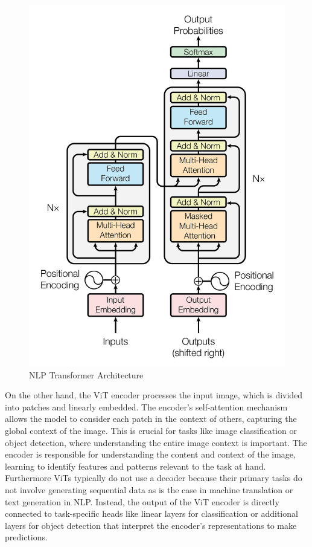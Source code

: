 \begin{figure}[h!]
    \centering
    \includegraphics[scale=0.2]{Figures/transformer_basis.jpg}
    \caption{NLP Transformer Architecture}
    \label{fig:tr-base}
\end{figure}

\newpage
On the other hand, the ViT encoder processes the input image, which is divided into patches and linearly embedded. The encoder's self-attention mechanism 
allows the model to consider each patch in the context of others, capturing the global context of the image. This is crucial for tasks like image 
classification or object detection, where understanding the entire image context is important. The encoder is responsible for understanding the content and 
context of the image, learning to identify features and patterns relevant to the task at hand. Furthermore ViTs typically do not use a decoder because their 
primary tasks do not involve generating sequential data as is the case in machine translation or text generation in NLP. Instead, the output of the ViT 
encoder is directly connected to task-specific heads like linear layers for classification or additional layers for object detection that interpret the 
encoder's representations to make predictions.

